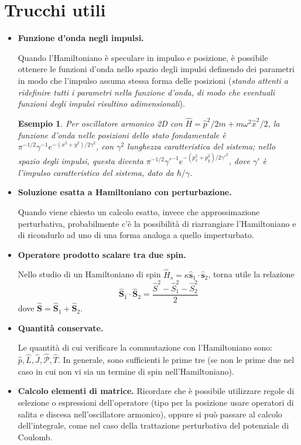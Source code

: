 \documentclass[11pt, a4paper]{scrartcl} %
\numberwithin{equation}{section}
\theoremstyle{style2}
\theoremstyle{style1}
\newtheorem{esempio}{Esempio}[section]
\begin{document}
\section{Trucchi utili}
\begin{multicols}{2}
\begin{itemize}
	\item \textbf{Funzione d'onda negli impulsi.} 

		Quando l'Hamiltoniano \`e speculare in impulso e posizione, \`e possibile ottenere le funzioni d'onda nello spazio degli impulsi definendo dei parametri in modo che l'impulso assuma stessa forma delle posizioni (\textit{stando attenti a ridefinire tutti i parametri nella funzione d'onda, di modo che eventuali funzioni degli impulsi risultino adimensionali}).
		\begin{esempio}
	Per oscillatore armonico 2D con $\hat{H}= \hat{p}^2 / 2m + m\omega ^2 \hat{x}^2 / 2$, la funzione d'onda nelle posizioni dello stato fondamentale \`e $\pi^{-1 / 2} \gamma^{-1} e^{-(x^2 + y^2) / 2 \gamma^2} $, con $\gamma^2$ lunghezza caratteristica del sistema; nello spazio degli impulsi, questa diventa $\pi^{-1 / 2} \gamma'^{-1} e^{-(p_x^2 + p_y^2) / 2 \gamma'^2} $, dove $\gamma'$ \`e l'impulso caratteristico del sistema, dato da $\hbar / \gamma$.
		\end{esempio}
	\item \textbf{Soluzione esatta a Hamiltoniano con perturbazione.} 

		Quando viene chiesto un calcolo esatto, invece che approssimazione perturbativa, probabilmente c'\`e la possibilit\`a di riarrangiare l'Hamiltoniano e di ricondurlo ad uno di una forma analoga a quello imperturbato.
	\item \textbf{Operatore prodotto scalare tra due spin.} 

		Nello studio di un Hamiltoniano di spin $\hat{H}_s = \kappa \hat{\mathbf{s} }_1 \cdot \hat{\mathbf{s} }_2$, torna utile la relazione
		\begin{equation}
			\hat{\mathbf{S} }_1 \cdot \hat{\mathbf{S} }_2 = \frac{\hat{S}^2 - \hat{S}_1^2 - \hat{S}_2^2}{2}
		\end{equation}
		dove $\hat{\mathbf{S} } = \hat{\mathbf{S} }_1 + \hat{\mathbf{S} }_2$.
	\item \textbf{Quantit\`a conservate.} 

		Le quantit\`a di cui verificare la commutazione con l'Hamiltoniano sono: $\hat{p}, \hat{L}, \hat{J}, \hat{\mathcal{P} }, \hat{T}$. 
		In generale, sono sufficienti le prime tre (se non le prime due nel caso in cui non vi sia un termine di spin nell'Hamiltoniano).
	\item {\sffamily \bfseries Calcolo elementi di matrice.} Ricordare che \`e possibile utilizzare regole di selezione o espressioni dell'operatore (tipo per la posizione usare operatori di salita e discesa nell'oscillatore armonico), oppure si pu\`o passare al calcolo dell'integrale, come nel caso della trattazione perturbativa del potenziale di Coulomb.
\end{itemize}
\end{multicols}
\end{document}
